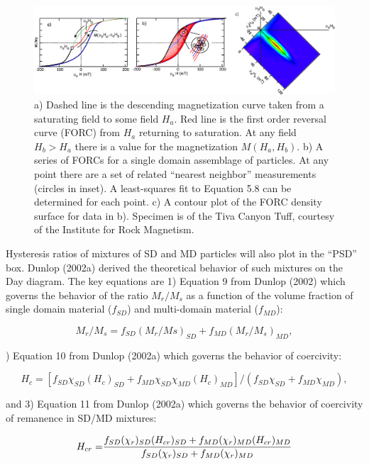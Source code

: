 \begin{figure}[h!tb]
\centering  \includegraphics[width=14 cm]{EPSfiles/forcprinc.eps}
\caption{a) Dashed line is the descending magnetization curve taken from a saturating field to some field $H_a$.  Red line is the first order reversal curve (FORC) from $H_a$ returning to saturation.   At any field $H_b>H_a$ there is a value for the magnetization $M(H_a,H_b)$.  b) A series of FORCs for a single domain assemblage of particles.  At any point  there are a set of related ``nearest neighbor'' measurements (circles in inset).  A least-squares fit to Equation 5.8 can be determined for each point.    c) A contour plot of the FORC density surface for data in b).   Specimen is  of the Tiva Canyon Tuff, courtesy of the Institute for Rock Magnetism.   }
\label{fig:forcprinc}
\end{figure}


Hysteresis ratios of mixtures of SD and MD particles will also plot in the ``PSD'' box.  Dunlop (2002a) derived the theoretical behavior of such mixtures on the Day diagram.    The key equations are 1) Equation 9 from Dunlop (2002) which governs the behavior of the ratio $M_r/M_s$ as a function of the volume fraction of single domain material ($f_{SD}$) and multi-domain material ($f_{MD}$): 

$$
{M_r/M_s} = f_{SD} (M_r/Ms)_{SD} + f_{MD} (M_r/M_s)_{MD}, 
$$

) Equation 10 from Dunlop (2002a) which governs the behavior of coercivity:

$$
H_c = [f_{SD} \chi_{SD} (H_c)_{SD} + f_{MD} \chi_{SD} \chi_{MD} (H_c)_{MD}] / (f_{SD} \chi_{SD} + f_{MD} \chi_{MD}), 
$$

\noindent and 3) Equation 11 from Dunlop (2002a) which governs the behavior of coercivity of remanence in SD/MD mixtures:

$$
{H_{cr} =}  {{  f_{SD}( \chi_r)_{SD} (H_{cr})_{SD} +  f_{MD}( \chi_r)_{MD} (H_{cr})_{MD} } \over { f_{SD} (\chi_r)_{SD} + f_{MD} (\chi_r)_{MD} }}
$$

